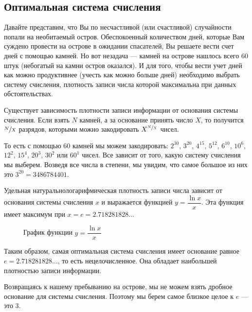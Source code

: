 \subsection{Оптимальная система счисления}\label{subsec:optimal-notation}

Давайте представим, что Вы по несчастливой (или счастливой) случайности попали на необитаемый остров.
Обеспокоенный количеством дней, которые Вам суждено провести на острове в ожидании спасателей, Вы решаете вести счет дней с помощью камней.
Но вот незадача --- камней на острове нашлось всего 60 штук (небогатый на камни остров оказался).
И для того, чтобы вести учет дней как можно продуктивнее (учесть как можно больше дней) необходимо выбрать систему счисления, плотность записи числа которой максимальна при данных обстоятельствах.

Существует зависимость плотности записи информации от основания системы счисления.
Если взять $N$ камней, а за основание принять число $X$, то получится $\sfrac{N}{X}$ разрядов, которыми можно закодировать $X^{\sfrac{N}{X}}$ чисел.

То есть с помощью 60 камней мы можем закодировать: $2^{30}$, $3^{20}$, $4^{15}$, $5^{12}$, $6^{10}$, $10^{6}$, $12^{2}$, $15^{4}$, $20^{3}$, $30^{2}$ или $60^1$ чисел.
Все зависит от того, какую систему счисления мы выберем. Возведя все числа в степени, мы увидим, что самое большое из них это $3^{20} = \num{3486784401}$.

Удельная натуральнологарифмическая плотность записи числа зависит от основания системы счисления $x$ и выражается функцией $y = \dfrac{\ln{x}}{x}$.
Эта функция имеет максимум при $x = e = \num{2.718281828}\dots$

\begin{figure}[H]
    \centering
    \caption{График функции $y = \dfrac{\ln{x}}{x}$}\label{fig:lnx-on-x-plot}
\end{figure}

Таким образом, самая оптимальная система счисления имеет основание равное $e = \num{2.718281828}\dots$, то есть нецелочисленное.
Она обладает наибольшей плотностью записи информации.

Возвращаясь к нашему пребыванию на острове, мы не можем взять дробное основание для системы счисления.
Поэтому мы берем самое близкое целое к $e$ --- это 3.
